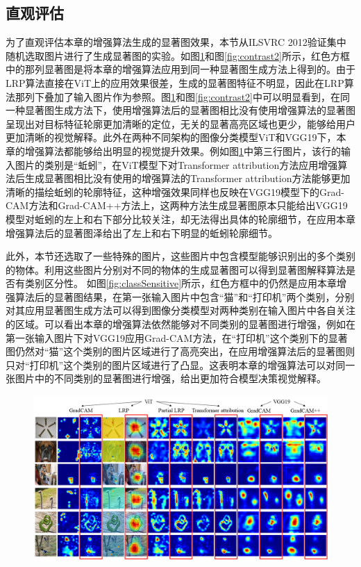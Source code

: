 \subsection{直观评估}
为了直观评估本章的增强算法生成的显著图效果，本节从ILSVRC 2012验证集中随机选取图片进行了生成显著图的实验。如图\ref{fig:contrast1}和图\ref{fig:contrast2}所示，红色方框中的那列显著图是将本章的增强算法应用到同一种显著图生成方法上得到的。由于LRP算法直接在ViT上的应用效果很差，生成的显著图特征不明显，因此在LRP算法那列下叠加了输入图片作为参照。图\ref{fig:contrast1}和图\ref{fig:contrast2}中可以明显看到，在同一种显著图生成方法下，使用增强算法后的显著图相比没有使用增强算法的显著图呈现出对目标特征轮廓更加清晰的定位，无关的显著高亮区域也更少，能够给用户更加清晰的视觉解释。此外在两种不同架构的图像分类模型ViT和VGG19下，本章的增强算法都能够给出明显的视觉提升效果。例如图\ref{fig:contrast1}中第三行图片，该行的输入图片的类别是“蚯蚓”，在ViT模型下对Transformer attribution方法应用增强算法后生成显著图相比没有使用的增强算法的Transformer attribution方法能够更加清晰的描绘蚯蚓的轮廓特征，这种增强效果同样也反映在VGG19模型下的Grad-CAM方法和Grad-CAM++方法上，这两种方法生成显著图原本只能给出VGG19模型对蚯蚓的左上和右下部分比较关注，却无法得出具体的轮廓细节，在应用本章增强算法后的显著图泽给出了左上和右下明显的蚯蚓轮廓细节。

此外，本节还选取了一些特殊的图片，这些图片中包含模型能够识别出的多个类别的物体。利用这些图片分别对不同的物体的生成显著图可以得到显著图解释算法是否有类别区分性。 如图\ref{fig:classSensitive}所示，红色方框中的仍然是应用本章增强算法后的显著图结果，在第一张输入图片中包含“猫”和“打印机”两个类别，分别对其应用显著图生成方法可以得到图像分类模型对两种类别在输入图片中各自关注的区域。可以看出本章的增强算法依然能够对不同类别的显著图进行增强，例如在第一张输入图片下对VGG19应用Grad-CAM方法，在“打印机”这个类别下的显著图仍然对“猫”这个类别的图片区域进行了高亮突出，在应用增强算法后的显著图则只对“打印机”这个类别的图片区域进行了凸显。这表明本章的增强算法可以对同一张图片中的不同类别的显著图进行增强，给出更加符合模型决策视觉解释。

\begin{figure}[h]
	\centering 
	\includegraphics[width=15cm]{fig/ch4/Contrast.png}
	\label{fig:contrast1}
\end{figure}

